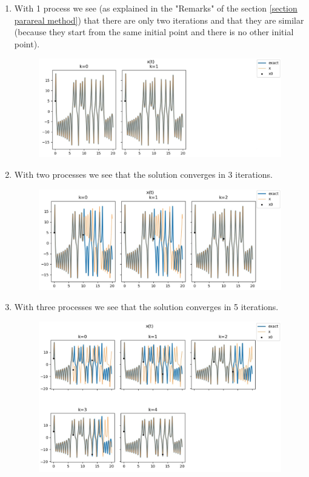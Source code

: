 \begin{enumerate}[label=\textbullet]

	\item With 1 process we see (as explained in the "Remarks" of the section \ref{section parareal method}) that there are only two iterations and that they are similar (because they start from the same initial point and there is no other initial point).
	\begin{figure}[H]
		\centering       
		\includegraphics[width=0.9\linewidth]{"images/parareal/lorenz_1p.jpg"}
		\label{lorenz:1}
	\end{figure}
\newpage
	\item With two processes we see that the solution converges in 3 iterations.
	\begin{figure}[H]       
		\centering
		\includegraphics[width=0.9\linewidth]{"images/parareal/lorenz_2p.jpg"}
		\label{lorenz:2}
	\end{figure}
	\item With three processes we see that the solution converges in 5 iterations.
	\begin{figure}[H]       
		\centering
		\includegraphics[width=0.9\linewidth]{"images/parareal/lorenz_3p.jpg"}

\end{figure}
\end{enumerate}
